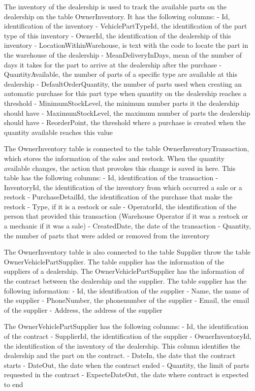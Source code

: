 The inventory of the dealership is used to track the available parts on the dealership on the table OwnerInventory.
It has the following columns:
- Id, identification of the inventory
- VehiclePartTypeId, the identification of the part type of this inventory
- OwnerId, the identification of the dealership of this inventory
- LocationWithinWarehouse, is text with the code to locate the part in the warehouse of the dealership
- MeanDeliveryInDays, mean of the number of days it takes for the part to arrive at the dealership after the purchase
- QuantityAvailable, the number of parts of a specific type are available at this dealership
- DefaultOrderQuantity, the number of parts used when creating an automatic purchase for this part type when quantity on the dealership reaches a threshold
- MinimumStockLevel, the minimum number parts it the dealership should have
- MaximumStockLevel, the maximum number of parts the dealership should have
- ReorderPoint, the threshold where a purchase is created when the quantity available reaches this value

The OwnerInventory table is connected to the table OwnerInventoryTransaction, which stores the information of the sales and restock. When the quantity available changes, the action that provokes this change is saved in here.
This table has the following columns:
- Id, identification of the transaction
- InventoryId, the identification of the inventory from which occurred a sale or a restock
- PurchaseDetailId, the identification of the purchase that make the restock
- Type, if it is a restock or sale
- OperatorId, the identification of the person that provided this transaction (Warehouse Operator if it was a restock or a mechanic if it was a sale)
- CreatedDate, the date of the transaction
- Quantity, the number of parts that were added or removed from the inventory

The OwnerInventory table is also connected to the table Supplier throw the table OwnerVehiclePartSupplier.
The table supplier has the information of the suppliers of a dealership. The OwnerVehiclePartSupplier has the information of the contract between the dealership and the supplier. 
The table supplier has the following information:
- Id, the identification of the supplier
- Name, the name of the supplier
- PhoneNumber, the phonenumber of the supplier 
- Email, the email of the supplier
- Address, the address of the supplier

The OwnerVehiclePartSupplier has the following columns:
- Id, the identification of the contract
- SupplierId, the identification of the supplier
- OwnerInventoryId, the identification of the inventory of the dealership. This column identifies the dealership and the part on the contract.
- DateIn, the date that the contract starts
- DateOut, the date when the contract ended
- Quantity, the limit of parts requested in the contract
- ExpecteDateOut, the date where contract is expected to end

